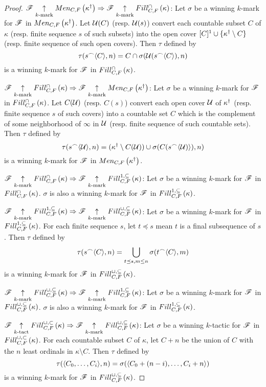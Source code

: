 \documentclass{amsart}
\theoremstyle{definition}
\begin{document}
\begin{proof}
  \(\mathscr{F} \underset{k\text{-mark}}{\uparrow}Men_{C,F}\left({\kappa^\dagger}\right)
    \Rightarrow
  \mathscr{F} \underset{k\text{-mark}}{\uparrow}Fill^{\cap}_{C,F}\left({\kappa}\right)\):
  Let \(\sigma\) be a winning \(k\)-mark for \(\mathscr{F}\) in
  \(Men_{C,F}\left({\kappa^\dagger}\right)\). Let \(\mathcal{U}(C)\) (resp. \(\mathcal{U}(s)\)) convert each
  countable subset \(C\) of \(\kappa\) (resp. finite sequence \(s\) of such subsets)
  into the open cover \([C]^1\cup\{\kappa^\dagger\setminus C\}\)
  (resp. finite sequence of such open covers). Then \(\tau\) defined by
    \[
      \tau(s{^\frown}\langle C\rangle,n)
        =
      C\cap\sigma(\mathcal{U}(s{^\frown}\langle C\rangle),n)
    \]
  is a winning \(k\)-mark for \(\mathscr{F}\) in \(Fill^{\cap}_{C,F}\left({\kappa}\right)\).

  \(\mathscr{F} \underset{k\text{-mark}}{\uparrow}Fill^{\cap}_{C,F}\left({\kappa}\right)
    \Rightarrow
  \mathscr{F} \underset{k\text{-mark}}{\uparrow}Men_{C,F}\left({\kappa^\dagger}\right)\):
  Let \(\sigma\) be a winning \(k\)-mark for \(\mathscr{F}\) in
  \(Fill^{\cap}_{C,F}\left({\kappa}\right)\). Let \(C(\mathcal{U})\) (resp. \(C(s)\)) convert each open
  cover \(\mathcal{U}\) of \(\kappa^\dagger\) (resp. finite sequence \(s\) of such covers)
  into a countable set \(C\) which is the complement of some neighborhood of
  \(\infty\) in \(\mathcal{U}\) (resp. finite sequence of such countable sets).
  Then \(\tau\) defined by
    \[
      \tau(s{^\frown}\langle\mathcal{U}\rangle,n)
        =
      (\kappa^\dagger\setminus C(\mathcal{U}))
        \cup
      \sigma(C(s{^\frown}\langle\mathcal{U})\rangle),n)
    \]
  is a winning \(k\)-mark for \(\mathscr{F}\) in \(Men_{C,F}\left({\kappa^\dagger}\right)\).

  \(\mathscr{F} \underset{k\text{-mark}}{\uparrow}Fill^{\cap}_{C,F}\left({\kappa}\right)
    \Rightarrow
  \mathscr{F} \underset{k\text{-mark}}{\uparrow}Fill^{1,\subseteq}_{C,F}\left({\kappa}\right)\):
  Let \(\sigma\) be a winning \(k\)-mark for \(\mathscr{F}\) in
  \(Fill^{\cap}_{C,F}\left({\kappa}\right)\). \(\sigma\) is also a winning \(k\)-mark for \(\mathscr{F}\)
  in \(Fill^{1,\subseteq}_{C,F}\left({\kappa}\right)\).

  \(\mathscr{F} \underset{k\text{-mark}}{\uparrow}Fill^{1,\subseteq}_{C,F}\left({\kappa}\right)
    \Rightarrow
  \mathscr{F} \underset{k\text{-mark}}{\uparrow}Fill^{\cup,\subseteq}_{C,F}\left({\kappa}\right)\): Let \(\sigma\) be a winning \(k\)-mark for \(\mathscr{F}\) in
  \(Fill^{1,\subseteq}_{C,F}\left({\kappa}\right)\). For each finite sequence \(s\), let \(t\preceq s\) mean \(t\)
  is a final subsequence of \(s\). Then \(\tau\) defined by
    \[
      \tau(s{^\frown}\langle C\rangle,n)
        =
      \bigcup_{t\preceq s, m\leq n}
      \sigma(t{^\frown}\langle C\rangle,m)
    \]
  is a winning \(k\)-mark for \(\mathscr{F}\) in \(Fill^{\cup,\subseteq}_{C,F}\left({\kappa}\right)\).

  \(\mathscr{F} \underset{k\text{-mark}}{\uparrow}Fill^{\cup,\subseteq}_{C,F}\left({\kappa}\right)
    \Rightarrow
  \mathscr{F} \underset{k\text{-mark}}{\uparrow}Fill^{1,\subseteq}_{C,F}\left({\kappa}\right)\):
  Let \(\sigma\) be a winning \(k\)-mark for \(\mathscr{F}\) in
  \(Fill^{\cup,\subseteq}_{C,F}\left({\kappa}\right)\). \(\sigma\) is also a winning \(k\)-mark for \(\mathscr{F}\)
  in \(Fill^{1,\subseteq}_{C,F}\left({\kappa}\right)\).

  \(\mathscr{F} \underset{k\text{-tact}}{\uparrow}Fill^{\cup,\subset}_{C,F}\left({\kappa}\right)
    \Rightarrow
  \mathscr{F} \underset{k\text{-mark}}{\uparrow}Fill^{\cup,\subseteq}_{C,F}\left({\kappa}\right)\):
  Let \(\sigma\) be a winning \(k\)-tactic for \(\mathscr{F}\) in
  \(Fill^{\cup,\subset}_{C,F}\left({\kappa}\right)\). For each countable subset \(C\) of \(\kappa\), let \(C+n\)
  be the union of \(C\) with the \(n\) least ordinals in \(\kappa\setminus C\).
  Then \(\tau\) defined by
    \[
      \tau(\langle C_0,\dots,C_i\rangle,n)
        =
      \sigma(\langle C_0+(n-i),\dots,C_i+n\rangle)
    \]
  is a winning \(k\)-mark for \(\mathscr{F}\) in \(Fill^{\cup,\subseteq}_{C,F}\left({\kappa}\right)\).
\end{proof}
\end{document}
